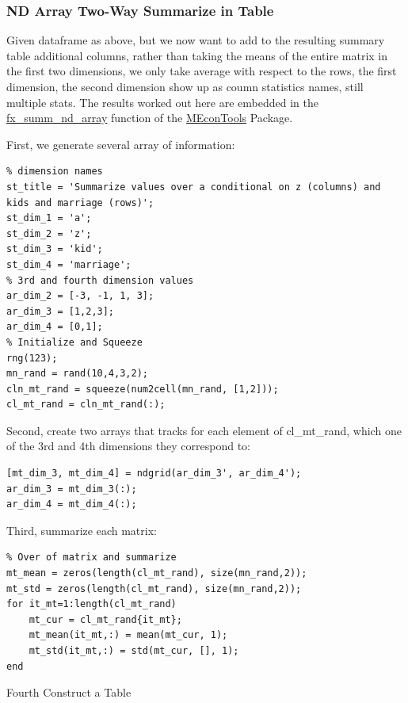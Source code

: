 \documentclass[
]{book}
\begin{document}
\hypertarget{nd-array-two-way-summarize-in-table}{%
\subsubsection{ND Array Two-Way Summarize in Table}\label{nd-array-two-way-summarize-in-table}}

Given dataframe as above, but we now want to add to the resulting
summary table additional columns, rather than taking the means of the
entire matrix in the first two dimensions, we only take average with
respect to the rows, the first dimension, the second dimension show up
as coumn statistics names, still multiple stats. The results worked out
here are embedded in the
\href{https://fanwangecon.github.io/MEconTools/MEconTools/doc/summ/htmlpdfm/fx_summ_nd_array.html}{fx\_summ\_nd\_array}
function of the \href{https://fanwangecon.github.io/MEconTools/}{MEconTools}
Package.

First, we generate several array of information:

\begin{verbatim}
% dimension names
st_title = 'Summarize values over a conditional on z (columns) and kids and marriage (rows)';
st_dim_1 = 'a';
st_dim_2 = 'z';
st_dim_3 = 'kid';
st_dim_4 = 'marriage';
% 3rd and fourth dimension values
ar_dim_2 = [-3, -1, 1, 3];
ar_dim_3 = [1,2,3];
ar_dim_4 = [0,1];
% Initialize and Squeeze
rng(123);
mn_rand = rand(10,4,3,2);
cln_mt_rand = squeeze(num2cell(mn_rand, [1,2]));
cl_mt_rand = cln_mt_rand(:);
\end{verbatim}

Second, create two arrays that tracks for each element of cl\_mt\_rand,
which one of the 3rd and 4th dimensions they correspond to:

\begin{verbatim}
[mt_dim_3, mt_dim_4] = ndgrid(ar_dim_3', ar_dim_4');
ar_dim_3 = mt_dim_3(:);
ar_dim_4 = mt_dim_4(:);
\end{verbatim}

Third, summarize each matrix:

\begin{verbatim}
% Over of matrix and summarize
mt_mean = zeros(length(cl_mt_rand), size(mn_rand,2));
mt_std = zeros(length(cl_mt_rand), size(mn_rand,2));
for it_mt=1:length(cl_mt_rand)
    mt_cur = cl_mt_rand{it_mt};
    mt_mean(it_mt,:) = mean(mt_cur, 1);
    mt_std(it_mt,:) = std(mt_cur, [], 1);
end
\end{verbatim}

Fourth Construct a Table
\end{document}
